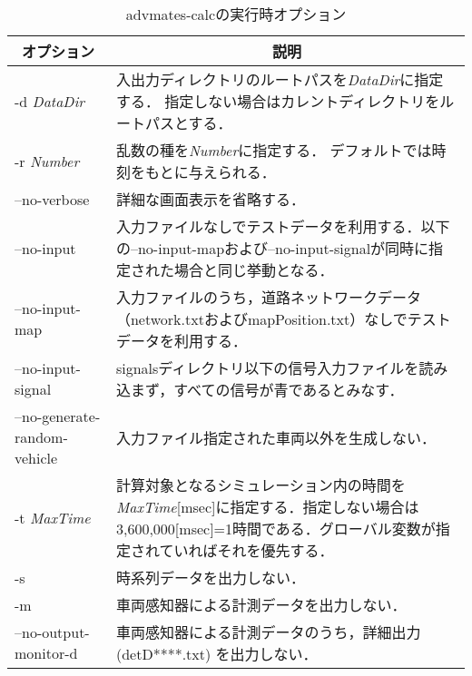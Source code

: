 \begin{table}[hbt]
  \caption{advmates-calcの実行時オプション}
  \small
  \begin{center}
    \begin{tabular}{|l|p{20em}|} \hline
      \multicolumn{1}{|c|}{オプション}
      & \multicolumn{1}{|c|}{説明} \\ \hline\hline
      
      -d {\sl DataDir}
      & 入出力ディレクトリのルートパスを{\sl DataDir}に指定する．
      指定しない場合はカレントディレクトリをルートパスとする． \\ \hline
      
      -r {\sl Number}
      & 乱数の種を{\sl Number}に指定する．
      デフォルトでは時刻をもとに与えられる． \\ \hline
      
      --no-verbose
      & 詳細な画面表示を省略する．\\ \hline
      
      --no-input
      & 入力ファイルなしでテストデータを利用する．以下の--no-input-mapおよび--no-input-signalが同時に指定された場合と同じ挙動となる．\\ \hline
      
      --no-input-map
      & 入力ファイルのうち，道路ネットワークデータ（network.txtおよびmapPosition.txt）なしでテストデータを利用する．\\ \hline
      
      --no-input-signal
      & signalsディレクトリ以下の信号入力ファイルを読み込まず，すべての信号が青であるとみなす．\\ \hline
      
      --no-generate-random-vehicle
      & 入力ファイル指定された車両以外を生成しない．\\ \hline
      
      -t {\sl MaxTime}
      & 計算対象となるシミュレーション内の時間を{\sl MaxTime}[msec]に指定する．指定しない場合は3,600,000[msec]=1時間である．グローバル変数が指定されていればそれを優先する．\\ \hline
      
      -s
      & 時系列データを出力しない．\\ \hline
      
      -m
      & 車両感知器による計測データを出力しない．\\ \hline
      
      --no-output-monitor-d
      & 車両感知器による計測データのうち，詳細出力 (detD****.txt) を出力しない．\\ \hline
      

\end{tabular}
\end{center}
\end{table}
